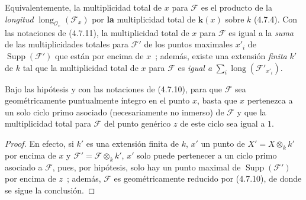 Equivalentemente, la multiplicidad total de $x$ para $\mathscr F$ es el
producto de la \emph{longitud}
$\operatorname{long}_{\mathcal O_x}(\mathscr F_x)$ por \textbf{la} multiplicidad total
de $\boldsymbol{k}(x)$ sobre $k$ (4.7.4). Con las notaciones de (4.7.11), la multiplicidad
total de $x$ para $\mathscr F$ es igual a la \emph{suma} de las multiplicidades
totales para $\mathscr F'$ de los puntos maximales $x'_i$ de
$\operatorname{Supp}(\mathscr F')$ que están por encima de $x$~; además,
existe una extensión \emph{finita} $k'$ de $k$ tal que la multiplicidad total de $x$
para $\mathscr F$ es \emph{igual a}
$\sum_i\operatorname{long}(\mathscr F'_{x'_i})$.

\begin{proposition}[4.7.13]
\label{IV.2.4.7.13-fr}
Bajo las hipótesis y con las notaciones de \textup{(4.7.10)}, para que $\mathscr F$ sea
geométricamente puntualmente íntegro en el punto $x$, basta que $x$ pertenezca
a un solo ciclo primo asociado (necesariamente no inmerso) de $\mathscr F$ y
que la multiplicidad total para $\mathscr F$ del punto genérico $z$ de este
ciclo sea igual a $1$.
\end{proposition}

\begin{proof}
En efecto, si $k'$ es una extensión finita de $k$, $x'$ un punto de
$X'=X\otimes_k k'$ por encima de $x$ y
$\mathscr F'=\mathscr F\otimes_k k'$, $x'$ solo puede pertenecer a un ciclo
primo asociado a $\mathscr F$, pues, por hipótesis, solo hay un punto maximal
de $\operatorname{Supp}(\mathscr F')$ por encima de $z$~; además, $\mathscr F$
es geométricamente reducido por (4.7.10), de donde se sigue la conclusión.
\end{proof}
